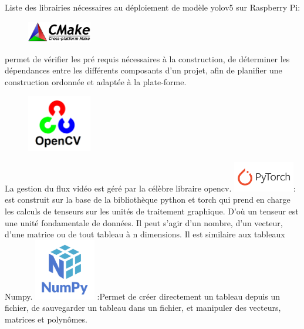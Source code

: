 Liste des librairies nécessaires au déploiement de modèle yolov5 sur Raspberry Pi:\\
  \begin{figure} 
{\includegraphics[width=0.25\textwidth]{figures/chap3/cmake-logo.png}} \end{figure}permet de vérifier les pré requis nécessaires à la construction, de déterminer les dépendances entre les différents composants d'un projet, afin de planifier une construction ordonnée et adaptée à la plate-forme.
\newline
\vspace{10pt}
\begin{figure}{\includegraphics[width=0.25\textwidth]{figures/chap3/OpenCV_Logo.png}}\end{figure}La gestion du flux vidéo est géré par la célèbre libraire opencv.
\newline
\includegraphics[width=0.20\textwidth]{figures/chap3/pytorch.png}: est construit sur la base de la bibliothèque python et torch qui prend en charge les calculs de tenseurs sur les unités de traitement graphique. D'où  un tenseur est une unité fondamentale de données. Il peut s'agir d'un nombre, d'un vecteur, d'une matrice ou de tout tableau à n dimensions. Il est similaire aux tableaux Numpy. 
\newline
\includegraphics[width=0.20\textwidth]{figures/chap3/numpy.png} :Permet de créer directement un tableau depuis un fichier, de sauvegarder un tableau dans un fichier, et manipuler des vecteurs, matrices et polynômes.

